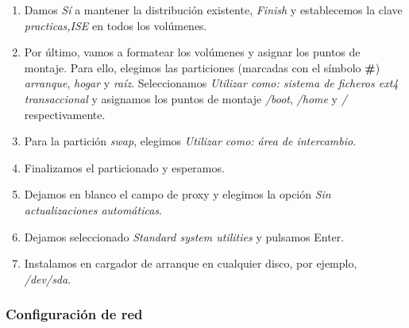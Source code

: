 \documentclass[12pt,spanish]{article}
\begin{document}
\begin{enumerate}
	\item Damos \textit{Sí} a mantener la distribución existente, \textit{Finish} y establecemos la clave \textit{practicas,ISE} en todos los volúmenes.
	\item Por último, vamos a formatear los volúmenes y asignar los puntos de montaje. Para ello, elegimos las particiones (marcadas con el símbolo \textbf{\#}) \textit{arranque}, \textit{hogar} y \textit{raíz}. Seleccionamos \textit{Utilizar como: sistema de ficheros ext4 transaccional} y asignamos los puntos de montaje \textit{/boot}, \textit{/home} y \textit{/} respectivamente.
	\item Para la partición \textit{swap}, elegimos \textit{Utilizar como: área de intercambio}.
	\item Finalizamos el particionado y esperamos.
	\item Dejamos en blanco el campo de proxy y elegimos la opción \textit{Sin actualizaciones automáticas}.
	\item Dejamos seleccionado \textit{Standard system utilities} y pulsamos Enter.
	\item Instalamos en cargador de arranque en cualquier disco, por ejemplo, \textit{/dev/sda}.

\end{enumerate}

\subsubsection{Configuración de red}
\end{document}
